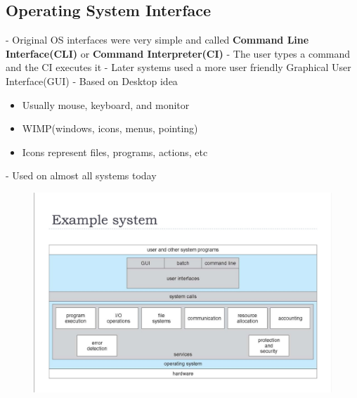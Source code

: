\documentclass[11pt]{article}
\theoremstyle{definition}
\begin{document}
    \subsection{Operating System Interface}
        - Original OS interfaces were very simple and called \textbf{Command Line Interface(CLI)} or \textbf{Command Interpreter(CI)}
        - The user types a command and the CI executes it
        - Later systems used a more user friendly Graphical User Interface(GUI)
        - Based on Desktop idea
            \begin{itemize}
                \item Usually mouse, keyboard, and monitor
                \item WIMP(windows, icons, menus, pointing)
                \item Icons represent files, programs, actions, etc
            \end{itemize}
        - Used on almost all systems today
        \begin{figure}
            \centering
            \includegraphics[width=1.0\linewidth]{Operating System/img/Example_system.jpg}
            \label{fig:enter-label}
        \end{figure}
\end{document}
